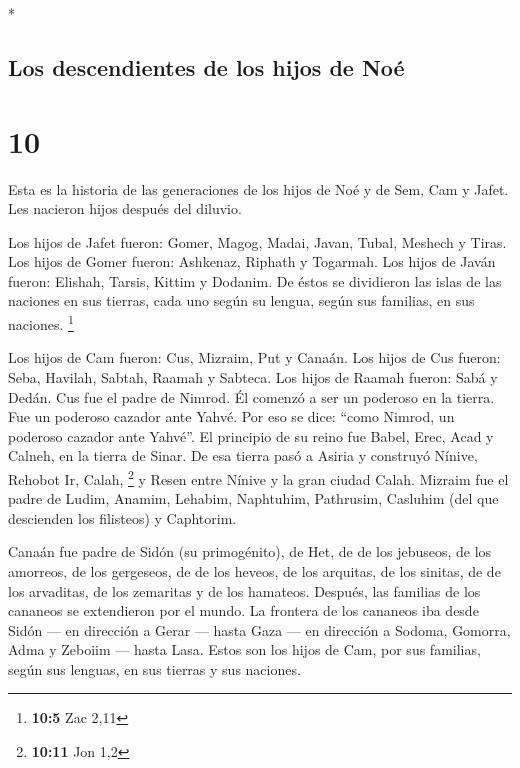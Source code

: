 \begin{paracol}{2}
\begin{otherlanguage}{english}
\end{otherlanguage}

\switchcolumn[0]*

\hypertarget{los-descendientes-de-los-hijos-de-nouxe9}{%
\subsection{Los descendientes de los hijos de
Noé}\label{los-descendientes-de-los-hijos-de-nouxe9}}

\hypertarget{section-18}{%
\section{10}\label{section-18}}

 Esta es la historia de las generaciones de los hijos de
Noé y de Sem, Cam y Jafet. Les nacieron hijos después del diluvio.

 Los hijos de Jafet fueron: Gomer, Magog, Madai, Javan,
Tubal, Meshech y Tiras.  Los hijos de Gomer fueron:
Ashkenaz, Riphath y Togarmah.  Los hijos de Javán fueron:
Elishah, Tarsis, Kittim y Dodanim.  De éstos se dividieron
las islas de las naciones en sus tierras, cada uno según su lengua,
según sus familias, en sus naciones. \footnote{\textbf{10:5} Zac 2,11}

 Los hijos de Cam fueron: Cus, Mizraim, Put y Canaán.
 Los hijos de Cus fueron: Seba, Havilah, Sabtah, Raamah y
Sabteca. Los hijos de Raamah fueron: Sabá y Dedán.  Cus
fue el padre de Nimrod. Él comenzó a ser un poderoso en la tierra.
 Fue un poderoso cazador ante Yahvé. Por eso se dice:
``como Nimrod, un poderoso cazador ante Yahvé''.  El
principio de su reino fue Babel, Erec, Acad y Calneh, en la tierra de
Sinar.  De esa tierra pasó a Asiria y construyó Nínive,
Rehobot Ir, Calah, \footnote{\textbf{10:11} Jon 1,2}  y
Resen entre Nínive y la gran ciudad Calah.  Mizraim fue
el padre de Ludim, Anamim, Lehabim, Naphtuhim, 
Pathrusim, Casluhim (del que descienden los filisteos) y Caphtorim.

 Canaán fue padre de Sidón (su primogénito), de Het, de
 de los jebuseos, de los amorreos, de los gergeseos, de
 de los heveos, de los arquitas, de los sinitas, de
 de los arvaditas, de los zemaritas y de los hamateos.
Después, las familias de los cananeos se extendieron por el mundo.
 La frontera de los cananeos iba desde Sidón --- en
dirección a Gerar --- hasta Gaza --- en dirección a Sodoma, Gomorra,
Adma y Zeboiim --- hasta Lasa.  Estos son los hijos de
Cam, por sus familias, según sus lenguas, en sus tierras y sus naciones.


\end{paracol}
